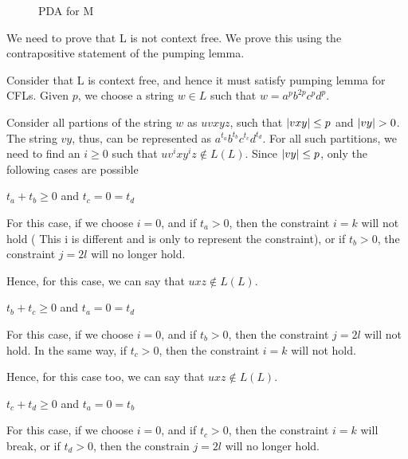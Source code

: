 \documentclass{article}
\begin{document}
\begin{question}
\begin{qpart}{2}
\begin{figure}[h!]
\begin{tikzpicture}[->, >=stealth', shorten >=1pt, auto, node distance=2.8cm, semithick]
				\end{tikzpicture}
				\caption{PDA for M}
			\end{figure}

	\end{qpart}

	\begin{qpart}{3}

		We need to prove that L is not context free. We prove this using the contrapositive statement of the pumping lemma. \br%

		Consider that L is context free, and hence it must satisfy pumping lemma for CFLs. Given $p$, we choose a string $w \in L$ such that $w = a^p b^{2p} c^p d^p$. \br%
		
		Consider all partions of the string $w$ as $uvxyz$, such that $\abs{vxy} \le p$ and $\abs{vy} > 0$. The string $vy$, thus, can be represented as $a^{t_a} b^{t_b} c^{t_c} d^{t_d}$. For all such partitions, we need to find an $i \ge 0$ such that $u v^i x y^i z \notin L(L)$. Since $\abs{vy} \le p$, only the following cases are possible \br%

		\begin{qcase}{1}{$t_a + t_b \ge 0$ and $t_c = 0 = t_d$}

			For this case, if we choose $i = 0$, and if $t_a > 0$, then the constraint $i = k$ will not hold ( This i is different and is only to represent the constraint), or if $t_b > 0$, the constraint $j = 2l$ will no longer hold. \br%
			
			Hence, for this case, we can say that $uxz \notin L(L)$.
			
		\end{qcase}

		\begin{qcase}{2}{$t_b + t_c \ge 0$ and $t_a = 0 = t_d$}

			For this case, if we choose $i = 0$, and if $t_b > 0$, then the constraint $j = 2l$ will not hold. In the same way, if $t_c > 0$, then the constraint $i = k$ will not hold. \br%

			Hence, for this case too, we can say that $uxz \notin L(L)$.
			
		\end{qcase}

		\begin{qcase}{3}{$t_c + t_d \ge 0$ and $t_a = 0 = t_b$}

			For this case, if we choose $i = 0$, and if $t_c > 0$, then the constraint $i = k$ will break, or if $t_d > 0$, then the constrain $j = 2l$ will no longer hold. \br%


\end{qcase}
\end{qpart}
\end{question}
\end{document}

